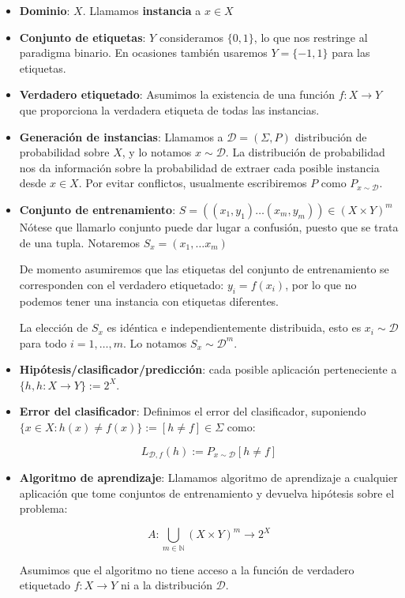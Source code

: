 \begin{itemize}
\item \textbf{Dominio}: $X$. Llamamos \textbf{instancia} a $x\in X$

\item \textbf{Conjunto de etiquetas}: $Y$ consideramos $\{0,1\}$, lo que nos restringe al paradigma binario. En ocasiones 
también usaremos $Y = \{-1,1\}$ para las etiquetas.

\item \textbf{Verdadero etiquetado}: \sloppy Asumimos la existencia de una función ${f: X \rightarrow Y}$ 
que proporciona la verdadera etiqueta de todas las instancias.

\item \textbf{Generación de instancias}: \fussy Llamamos a $\mathcal{D} = (\Sigma, P)$ distribución de probabilidad sobre $X$,
y lo notamos $x\sim \mathcal{D}$. La distribución de probabilidad nos da información sobre la probabilidad de extraer cada 
posible instancia desde  $x \in X$. Por evitar conflictos, usualmente escribiremos $P$ como $P_{x\sim \mathcal{D}}$.

\item \textbf{Conjunto de entrenamiento}: $S = ((x_1,y_1) \ldots (x_m,y_m)) \in (X \times Y)^m$ 
Nótese que llamarlo conjunto puede dar lugar a confusión, puesto que se trata de una tupla. Notaremos $S_x = (x_1, \ldots x_m)$

De momento asumiremos que las etiquetas del conjunto de entrenamiento se corresponden con el verdadero etiquetado: 
$y_i = f(x_i)$, por lo que no podemos tener una instancia con etiquetas diferentes.

La elección de $S_x$ es idéntica e independientemente distribuida, esto es $x_i \sim \mathcal{D}$ para todo $i=1, \ldots, m$.
Lo notamos $S_x \sim \mathcal{D}^m$.

\item \textbf{Hipótesis/clasificador/predicción}: cada posible aplicación perteneciente a 
$\{h, h:X \rightarrow Y\} := 2^{X}$. 

\item \textbf{Error del clasificador}: Definimos el error del clasificador, suponiendo 
$\{x\in X : h(x) \neq f(x)\} := [h\neq f] \in \Sigma$ como:

\[L_{\mathcal{D},f}(h) :=  P_{x\sim \mathcal{D}} [h \neq f]\]

\item \textbf{Algoritmo de aprendizaje}: Llamamos algoritmo de aprendizaje a cualquier aplicación que tome conjuntos de 
entrenamiento y devuelva hipótesis sobre el problema:

\[A: \underset{m\in \mathbb{N}}{\bigcup} (X\times Y)^m \rightarrow 2^{X}\]

Asumimos que el algoritmo no tiene acceso a la función de verdadero etiquetado $f: X \rightarrow Y$ ni a
la distribución $\mathcal{D}$.
\end{itemize}


